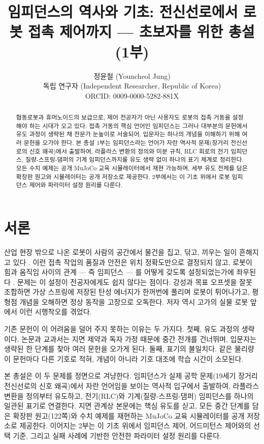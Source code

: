 \documentclass[11pt,a4paper]{article}
\title{임피던스의 역사와 기초: 전신선로에서 로봇 접촉 제어까지 --- 초보자를 위한 총설 (1부)}
\author{정윤철 (Youncheol Jung)\\
\small 독립 연구자 (Independent Researcher, Republic of Korea)\\
\small ORCID: 0009-0000-5282-881X}
\date{}
\begin{document}
\maketitle

\begin{abstract}
협동로봇과 휴머노이드의 보급으로, 제어 전공자가 아닌 사용자도 로봇의 접촉
거동을 설정해야 하는 시대가 오고 있다.
접촉 거동의 핵심 언어인 임피던스는 그러나 대부분의 문헌에서 유도 과정이
생략된 채 전문가 눈높이로 서술되어, 입문자는 하나의 개념을 이해하기 위해
여러 문헌을 오가야 한다.
본 총설 1부는 임피던스라는 언어가 자란 역사적 문제(장거리 전신선로의 신호
왜곡)에서 출발하여, 라플라스 변환의 정의와 미분 규칙, RLC 회로의 전기
임피던스, 질량-스프링-댐퍼의 기계 임피던스까지를 유도 생략 없이 하나의
표기 체계로 정리한다.
모든 수치 예제는 공개 MuJoCo 교육 시뮬레이터에서 재현 가능하며, 세부 유도
전체를 담은 확장판 원고와 시뮬레이터는 공개 저장소로 제공한다.
2부에서는 이 기초 위에서 로봇 임피던스 제어와 파라미터 설정 원리를 다룬다.
\end{abstract}

\section{서론}
\label{sec:u3-intro}

산업 현장 밖으로 나온 로봇이 사람의 공간에서 물건을 집고, 닦고, 끼우는
일이 흔해지고 있다 \cite{nvidia_physical_ai_2025}.
이런 접촉 작업의 품질과 안전은 위치 정확도만으로 결정되지 않고, 로봇이
힘과 움직임 사이의 관계 --- 즉 임피던스 --- 를 어떻게 갖도록 설정되었는가에
좌우된다 \cite{hogan1985impedancepart1,abudakka2020variableimpedance}.
문제는 이 설정이 전공자에게도 쉽지 않다는 점이다.
강성과 목표 오프셋을 잘못 조합하면 가상 스프링에 저장된 탄성 에너지가
한꺼번에 풀리며 로봇이 튀어나가고, 평형점 개념을 오해하면 정상 동작을
고장으로 오독한다.
저자 역시 고가의 실물 로봇 앞에서 이런 시행착오를 겪었다.

기존 문헌이 이 어려움을 덜어 주지 못하는 이유는 두 가지다.
첫째, 유도 과정의 생략이다.
논문과 교과서는 지면 제약과 독자 가정 때문에 중간 전개를 건너뛰며, 입문자는
생략된 한 단계를 찾아 여러 문헌을 오가게 된다.
둘째, 표기의 불일치다.
같은 물리량이 문헌마다 다른 기호로 적혀, 개념이 아니라 기호 대조에 학습
시간이 소모된다.

본 총설은 이 두 문제를 정면으로 겨냥한다.
임피던스가 실제 공학 문제(19세기 장거리 전신선로의 신호 왜곡)에서 자란
언어임을 보이는 역사적 입구에서 출발하여, 라플라스 변환을 정의부터
유도하고, 전기(RLC)와 기계(질량-스프링-댐퍼) 임피던스를 하나의 일관된
표기로 연결한다.
지면 관계상 본문에는 핵심 유도를 싣고, 모든 중간 단계를 담은 확장판
원고(122쪽)와 수치 예제를 재현하는 MuJoCo 교육 시뮬레이터를 공개 저장소로
제공한다.
이어지는 2부는 이 기초 위에서 임피던스 제어, 어드미턴스 제어와의 선택
기준, 그리고 실패 사례에 기반한 안전한 파라미터 설정 원리를 다룬다.













\end{document}
